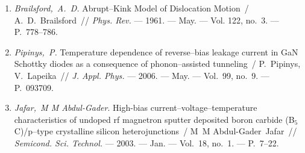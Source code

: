 \begin{enumerate}[label=\arabic*$^*$.,leftmargin=0em,itemindent=3em]
\item
\emph{Brailsford,~A.~D.} Abrupt--Kink Model of Dislocation Motion~/
  A.~D.~Brailsford~// \emph{Phys. Rev.} ---
  1961. --- May. ---
  Vol. 122, no.~3. ---
  P.~778--786.

\item
\emph{Pipinys,~P.} Temperature dependence of reverse--bias leakage current
  in {G}a{N} {S}chottky diodes as a consequence of phonon--assisted tunneling~/
  P.~Pipinys, V.~Lapeika~// \emph{J. Appl. Phys.} ---
  2006. --- May. ---
  Vol.~99, no.~9. ---
  P.~093709.

\item
\emph{Jafar,~M M Abdul-Gader}. High-bias current--voltage--temperature
  characteristics of undoped rf magnetron sputter deposited boron carbide
  ({B}$_5${C})/p--type crystalline silicon heterojunctions~/ M~M
  Abdul-Gader~Jafar~// \emph{Semicond. Sci. Technol.} ---
  2003. --- Jan. ---
  Vol.~18, no.~1. ---
  P.~7--22.
\end{enumerate}
